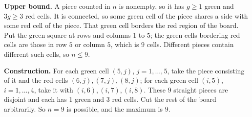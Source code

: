 \textbf{Upper bound.} A piece counted in $n$ is nonempty, so it has $g\ge1$ green and $3g\ge3$ red cells. It is connected, so some green cell of the piece shares a side with some red cell of the piece. That green cell borders the red region of the board. Put the green square at rows and columns $1$ to $5$; the green cells bordering red cells are those in row $5$ or column $5$, which is $9$ cells. Different pieces contain different such cells, so $n\le9$.

\textbf{Construction.} For each green cell $(5,j)$, $j=1,\dots,5$, take the piece consisting of it and the red cells $(6,j),(7,j),(8,j)$; for each green cell $(i,5)$, $i=1,\dots,4$, take it with $(i,6),(i,7),(i,8)$. These $9$ straight pieces are disjoint and each has $1$ green and $3$ red cells. Cut the rest of the board arbitrarily. So $n=9$ is possible, and the maximum is $\boxed{9}$.
